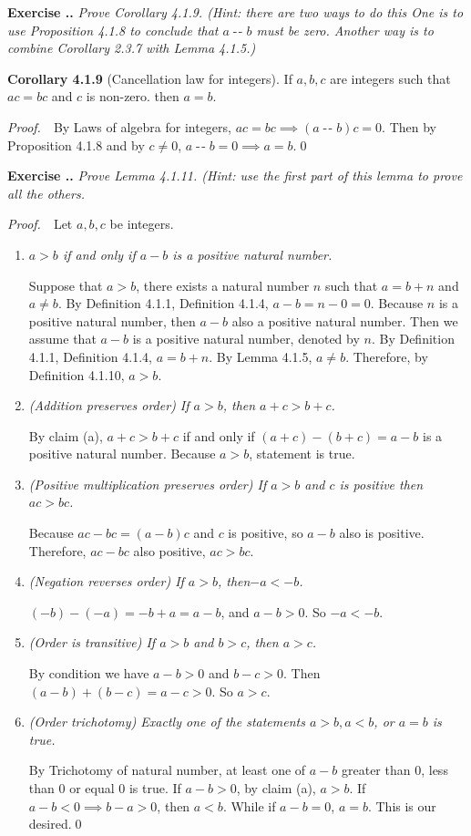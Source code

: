\documentclass{book}
\DeclareMathOperator{\tminus}{-\!-}%
\newcommand{\pff}{\vspace{.25em}\noindent\emph{Proof.}~~}
\newcommand{\titl}[1]{\noindent\textbf{#1}}
\newcounter{Exercise}[section]
\renewcommand{\theExercise}{\thesection.\arabic{Exercise}.}
\newcommand{\new}{\vspace{1.5em}\noindent\textbf{{Exercise \stepcounter{Exercise}\textbf{\theExercise}}} }
\begin{document}
\new\emph{Prove Corollary 4.1.9. (Hint: there are two ways to do this One is to use Proposition 4.1.8 to conclude that $a\tminus b$ must be zero. Another way is to combine Corollary 2.3.7 with Lemma 4.1.5.)}

\begin{framed}
\titl{Corollary 4.1.9} (Cancellation law for integers). If $a,b,c$ are integers such that $ac=bc$ and $c$ is non-zero. then $a=b$.
\end{framed}

\pff By Laws of algebra for integers, $ac=bc\implies(a\tminus b)c=0$. Then by Proposition 4.1.8 and by $c\ne0$, $a\tminus b=0\implies a=b$.\qed


\new\emph{Prove Lemma 4.1.11. (Hint: use the first part of this lemma to prove all the others.}

\pff Let $a,b,c$ be integers.
\begin{enumerate}
    \item \emph{$a>b$ if and only if $a-b$ is a positive natural number.}

    Suppose that $a>b$, there exists a natural number $n$ such that $a=b+n$ and $a\neq b$. By Definition 4.1.1, Definition 4.1.4, $a-b=n-0=0$. Because $n$ is a positive natural number, then $a-b$ also a positive natural number. Then we assume that $a-b$ is a positive natural number, denoted by $n$. By Definition 4.1.1, Definition 4.1.4, $a=b+n$. By Lemma 4.1.5, $a\neq b$. Therefore, by Definition 4.1.10, $a>b$.

    \item \emph{(Addition preserves order) If $a>b$, then $a+c>b+c$.}

    By claim (a), $a+c>b+c$ if and only if $(a+c)-(b+c)=a-b$ is a positive natural number. Because $a>b$, 
    statement is true.

    \item \emph{(Positive multiplication preserves order) If $a>b$ and $c$ is positive then $ac> bc$.}

    Because $ac-bc=(a-b)c$ and $c$ is positive, so $a-b$ also is positive. Therefore, $ac-bc$ also positive, $ac>bc$.

    \item \emph{(Negation reverses order) If $a>b$, then$-a<-b$.}

    $(−b)−(−a)=−b+a=a−b$, and $a−b>0$. So $-a<-b$.

    \item \emph{(Order is transitive) If $a>b$ and $b>c$, then $a>c$.}

    By condition we have $a-b>0$ and $b-c>0$. Then $(a-b)+(b-c)=a-c>0$. So $a>c$.

    \item \emph{(Order trichotomy) Exactly one of the statements $a>b, a<b$, or $a=b$ is true.}

    By Trichotomy of natural number, at least one of $a-b$ greater than 0, less than 0 or equal 0 is true. If $a-b>0$, by claim (a), $a>b$. If $a-b<0\implies b-a>0$, then $a<b$. While if $a-b=0$, $a=b$. This is our desired.\qed
\end{enumerate}
\end{document}
